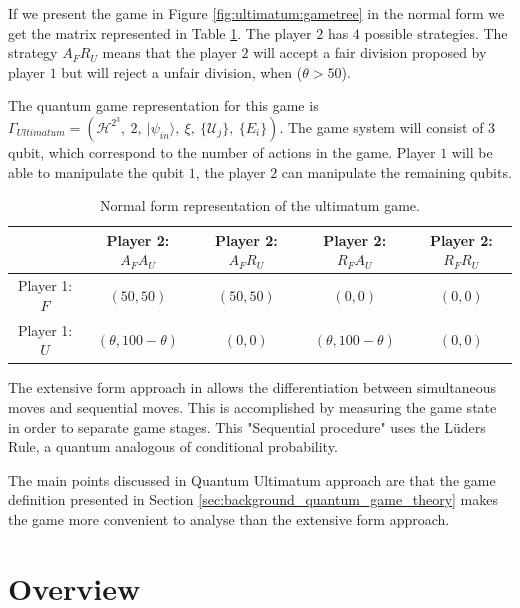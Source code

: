 If we present the game in Figure \ref{fig:ultimatum:gametree} in the normal form we get the matrix represented in Table \ref{tab:tabelaultimatumestoufofida}. The player $2$ has $4$ possible strategies. The strategy $A_{F}R_{U}$ means that the player $2$ will accept a fair division proposed by player $1$ but will reject a unfair division, when ($\theta > 50$).

 The quantum game representation for this game is $
\Gamma_{Ultimatum}=(\mathcal{H}^{2^{3}},\: 2,\:\vert\psi_{in}\rangle,\:\xi,\:\{\mathcal{U}_{j}\},\:\{E_{i}\})
$. The game system will consist of $3$ qubit, which correspond to the number of actions in the game. Player $1$ will be able to manipulate the qubit $1$, the player $2$ can manipulate the remaining qubits. 


\begin{center}
\begin{table}[h]
\begin{centering}
\begin{tabular}{ccccc}
\hline 
 & Player 2: $A_{F}A_{U}$ & Player 2: $A_{F}R_{U}$ & Player 2: $R_{F}A_{U}$ & Player 2: $R_{F}R_{U}$\tabularnewline
\hline 
Player 1: $F$ & $(50,50)$ & $(50,50)$& $(0,0)$ & $(0,0)$\tabularnewline
Player 1: $U$ & $(\theta,100-\theta)$ & $(0,0)$& $(\theta,100-\theta)$ & $(0,0)$\tabularnewline
\hline 
\end{tabular}
\par\end{centering}

\caption{Normal form representation of the ultimatum game.}
\label{tab:tabelaultimatumestoufofida}
\end{table}
\par\end{center}

The extensive form approach in \cite{Fra2011} allows the differentiation between simultaneous moves and sequential moves. This is accomplished by measuring the game state in order to separate game stages. This "Sequential procedure" uses the L\"{u}ders Rule, a quantum analogous of conditional probability.


The main points discussed in  \cite{Fra2011} Quantum Ultimatum approach are that the game definition presented in Section \ref{sec:background_quantum_game_theory}  makes the game more convenient to analyse than the extensive form approach.






\clearpage
\section{Overview}
\label{sec:related_work_overview}


